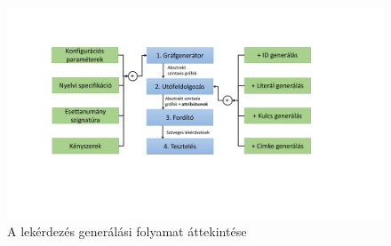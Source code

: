 \begin{figure}
	\centering
	\includegraphics[width=1.0\textwidth]{figures/blokkdiagramAttekintes}
	\caption{A lekérdezés generálási folyamat áttekintése}
	\label{fig:blokkdiagramAttekintes}
\end{figure}
